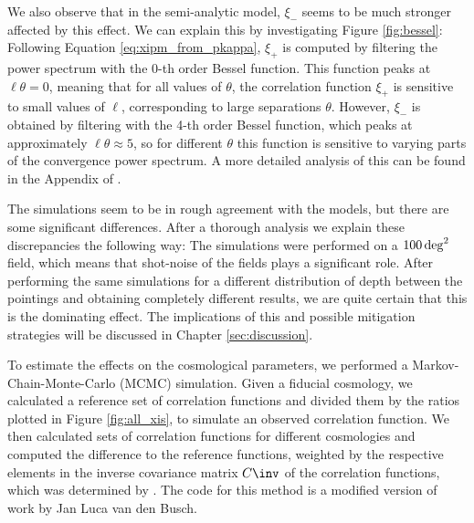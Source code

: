 We also observe that in the semi-analytic model, $\xi_-$ seems to be much stronger affected by this effect. We can explain this by investigating Figure \ref{fig:bessel}: Following Equation \eqref{eq:xipm_from_pkappa}, $\xi_+$ is computed by filtering the power spectrum with the 0-th order Bessel function. This function peaks at $\ell\theta=0$, meaning that for all values of $\theta$, the correlation function $\xi_+$ is sensitive to small values of $\ell$, corresponding to large separations $\theta$. However, $\xi_-$ is obtained by filtering with the 4-th order Bessel function, which peaks at approximately $\ell\theta\approx 5$, so for different $\theta$ this function is sensitive to varying parts of the convergence power spectrum. A more detailed analysis of this can be found in the Appendix of \citet{2017MNRAS.471.4412K}.

The simulations seem to be in rough agreement with the models, but there are some significant differences. After a thorough analysis we explain these discrepancies the following way: The simulations were performed on a $100\,\rm{deg}^2$ field, which means that shot-noise of the fields plays a significant role. After performing the same simulations for a different distribution of depth between the pointings and obtaining completely different results, we are quite certain that this is the dominating effect. The implications of this and possible mitigation strategies will be discussed in Chapter \ref{sec:discussion}.

To estimate the effects on the cosmological parameters, we performed a Markov-Chain-Monte-Carlo (MCMC) simulation. Given a fiducial cosmology, we calculated a reference set of correlation functions and divided them by the ratios plotted in Figure \ref{fig:all_xis}, to simulate an observed correlation function. We then calculated sets of correlation functions for different cosmologies and computed the difference to the reference functions, weighted by the respective elements in the inverse covariance matrix $C\inv$ of the correlation functions, which was determined by \citet{2018arXiv181206076H}. The code for this method is a modified version of work by Jan Luca van den Busch.

